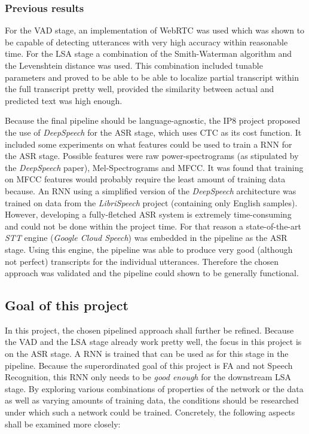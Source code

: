 \subsubsection{Previous results}
For the \ac{VAD} stage, an implementation of WebRTC was used which was shown to be capable of detecting utterances with very high accuracy within reasonable time. For the \ac{LSA} stage a combination of the Smith-Waterman algorithm and the Levenshtein distance was used. This combination included tunable parameters and proved to be able to be able to localize partial transcript within the full transcript pretty well, provided the similarity between actual and predicted text was high enough.

Because the final pipeline should be language-agnostic, the IP8 project proposed the use of \textit{DeepSpeech} for the \ac{ASR} stage, which uses \ac{CTC} \cite{ctc_paper} as its cost function. It included some experiments on what features could be used to train a \ac{RNN} for the \ac{ASR} stage. Possible features were raw power-spectrograms (as stipulated by the \textit{DeepSpeech} paper), Mel-Spectrograms and \ac{MFCC}. It was found that training on \ac{MFCC} features would probably require the least amount of training data because. An \ac{RNN} using a simplified version of the \textit{DeepSpeech} architecture was trained on data from the \textit{LibriSpeech} project (containing only English samples). However, developing a fully-fletched ASR system is extremely time-consuming and could not be done within the project time. For that reason a state-of-the-art \textit{\ac{STT}} engine (\textit{Google Cloud Speech}) was embedded in the pipeline as the \ac{ASR} stage. Using this engine, the pipeline was able to produce very good (although not perfect) transcripts for the individual utterances. Therefore the chosen approach was validated and the pipeline could shown to be generally functional.

\subsection{Goal of this project}

In this project, the chosen pipelined approach shall further be refined. Because the \ac{VAD} and the \ac{LSA} stage already work pretty well, the focus in this project is on the \ac{ASR} stage. A \ac{RNN} is trained that can be used as for this stage in the pipeline. Because the superordinated goal of this project is \ac{FA} and not Speech Recognition, this RNN only needs to be \textit{good enough} for the downstream \ac{LSA} stage. By exploring various combinations of properties of the network or the data as well as varying amounts of training data, the conditions should be researched under which such a network could be trained. Concretely, the following aspects shall be examined more closely:

